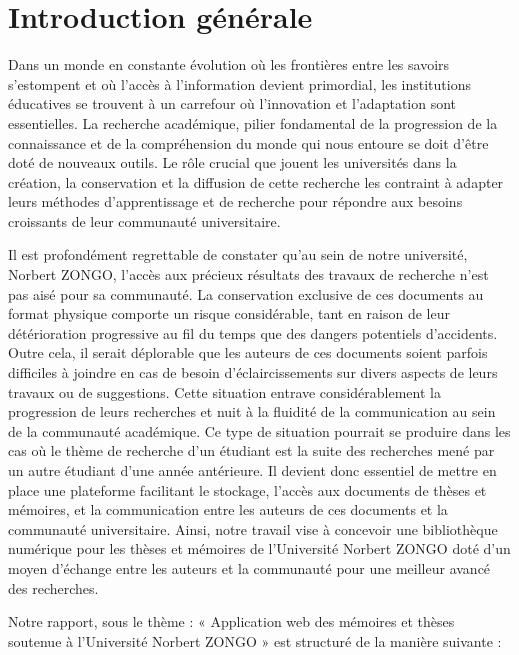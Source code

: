 \chapter*{Introduction générale}
\adjustmtc
\thispagestyle{MyStyle}


Dans un monde en constante évolution où les frontières entre les savoirs s'estompent et où l'accès à l'information devient primordial, les institutions éducatives se trouvent à un carrefour où l'innovation et l'adaptation sont essentielles. La recherche académique, pilier fondamental de la progression de la connaissance et de la compréhension du monde qui nous entoure se doit d’être doté de nouveaux outils. Le rôle crucial que jouent les universités dans la création, la conservation et la diffusion de cette recherche les contraint à adapter leurs méthodes d'apprentissage et de recherche pour répondre aux besoins croissants de leur communauté universitaire.\par
Il est profondément regrettable de constater qu'au sein de notre université, Norbert ZONGO, l'accès aux précieux résultats des travaux de recherche n'est pas aisé pour sa communauté. La conservation exclusive de ces documents au format physique comporte un risque considérable, tant en raison de leur détérioration progressive au fil du temps que des dangers potentiels d'accidents. Outre cela, il serait déplorable que les auteurs de ces documents soient parfois difficiles à joindre en cas de besoin d’éclaircissements sur divers aspects de leurs travaux ou de suggestions. Cette situation entrave considérablement la progression de leurs recherches et nuit à la fluidité de la communication au sein de la communauté académique. Ce type de situation pourrait se produire dans les cas où le thème de recherche d’un étudiant est la suite des recherches mené par un autre étudiant d’une année antérieure.
Il devient donc essentiel de mettre en place une plateforme facilitant le stockage, l'accès aux documents de thèses et mémoires, et la communication entre les auteurs de ces documents et la communauté universitaire.
Ainsi, notre travail vise à concevoir une bibliothèque numérique pour les thèses et mémoires de l’Université Norbert ZONGO doté d’un moyen d’échange entre les auteurs et la communauté pour une meilleur avancé des recherches.\par
Notre rapport, sous le thème : « Application web des mémoires et thèses soutenue à l'Université Norbert ZONGO » est structuré de la manière suivante :\\
